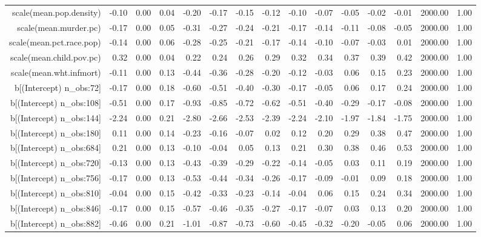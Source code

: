 \begin{table}[ht]
\begin{tabular}{rrrrrrrrrrrrrrr}
  scale(mean.pop.density) & -0.10 & 0.00 & 0.04 & -0.20 & -0.17 & -0.15 & -0.12 & -0.10 & -0.07 & -0.05 & -0.02 & -0.01 & 2000.00 & 1.00 \\ 
  scale(mean.murder.pc) & -0.17 & 0.00 & 0.05 & -0.31 & -0.27 & -0.24 & -0.21 & -0.17 & -0.14 & -0.11 & -0.08 & -0.05 & 2000.00 & 1.00 \\ 
  scale(mean.pct.race.pop) & -0.14 & 0.00 & 0.06 & -0.28 & -0.25 & -0.21 & -0.17 & -0.14 & -0.10 & -0.07 & -0.03 & 0.01 & 2000.00 & 1.00 \\ 
  scale(mean.child.pov.pc) & 0.32 & 0.00 & 0.04 & 0.22 & 0.24 & 0.26 & 0.29 & 0.32 & 0.34 & 0.37 & 0.39 & 0.42 & 2000.00 & 1.00 \\ 
  scale(mean.wht.infmort) & -0.11 & 0.00 & 0.13 & -0.44 & -0.36 & -0.28 & -0.20 & -0.12 & -0.03 & 0.06 & 0.15 & 0.23 & 2000.00 & 1.00 \\ 
  b[(Intercept) n\_obs:72] & -0.17 & 0.00 & 0.18 & -0.60 & -0.51 & -0.40 & -0.30 & -0.17 & -0.05 & 0.06 & 0.17 & 0.24 & 2000.00 & 1.00 \\ 
  b[(Intercept) n\_obs:108] & -0.51 & 0.00 & 0.17 & -0.93 & -0.85 & -0.72 & -0.62 & -0.51 & -0.40 & -0.29 & -0.17 & -0.08 & 2000.00 & 1.00 \\ 
  b[(Intercept) n\_obs:144] & -2.24 & 0.00 & 0.21 & -2.80 & -2.66 & -2.53 & -2.39 & -2.24 & -2.10 & -1.97 & -1.84 & -1.75 & 2000.00 & 1.00 \\ 
  b[(Intercept) n\_obs:180] & 0.11 & 0.00 & 0.14 & -0.23 & -0.16 & -0.07 & 0.02 & 0.12 & 0.20 & 0.29 & 0.38 & 0.47 & 2000.00 & 1.00 \\ 
  b[(Intercept) n\_obs:684] & 0.21 & 0.00 & 0.13 & -0.10 & -0.04 & 0.05 & 0.13 & 0.21 & 0.30 & 0.38 & 0.46 & 0.53 & 2000.00 & 1.00 \\ 
  b[(Intercept) n\_obs:720] & -0.13 & 0.00 & 0.13 & -0.43 & -0.39 & -0.29 & -0.22 & -0.14 & -0.05 & 0.03 & 0.11 & 0.19 & 2000.00 & 1.00 \\ 
  b[(Intercept) n\_obs:756] & -0.17 & 0.00 & 0.13 & -0.53 & -0.44 & -0.34 & -0.26 & -0.17 & -0.09 & -0.01 & 0.09 & 0.18 & 2000.00 & 1.00 \\ 
  b[(Intercept) n\_obs:810] & -0.04 & 0.00 & 0.15 & -0.42 & -0.33 & -0.23 & -0.14 & -0.04 & 0.06 & 0.15 & 0.24 & 0.34 & 2000.00 & 1.00 \\ 
  b[(Intercept) n\_obs:846] & -0.17 & 0.00 & 0.15 & -0.57 & -0.46 & -0.35 & -0.27 & -0.17 & -0.07 & 0.03 & 0.13 & 0.20 & 2000.00 & 1.00 \\ 
  b[(Intercept) n\_obs:882] & -0.46 & 0.00 & 0.21 & -1.01 & -0.87 & -0.73 & -0.60 & -0.45 & -0.32 & -0.20 & -0.05 & 0.06 & 2000.00 & 1.00 \\ 

\end{tabular}
\end{table}
